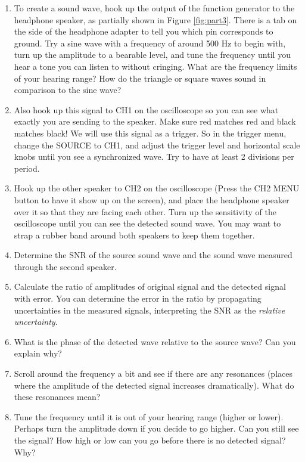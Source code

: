 \begin{enumerate}
\item To create a sound wave, hook up the output of the function generator to the headphone speaker, as partially shown in Figure \ref{fig:part3}. There is a tab on the side of the headphone adapter to tell you which pin corresponds to ground. Try a sine wave with a frequency of around 500 Hz to begin with, turn up the amplitude to a bearable level, and tune the frequency until you hear a tone you can listen to without cringing. What are the frequency limits of your hearing range? How do the triangle or square waves sound in comparison to the sine wave?

\item Also hook up this signal to CH1 on the oscilloscope so you can see what exactly you are sending to the speaker. Make sure red matches red and black matches black! We will use this signal as a trigger. So in the trigger menu, change the SOURCE to CH1, and adjust the trigger level and horizontal scale knobs until you see a synchronized wave. Try to have at least 2 divisions per period.

\item Hook up the other speaker to CH2 on the oscilloscope (Press the CH2 MENU button to have it show up on the screen), and place the headphone speaker over it so that they are facing each other. Turn up the sensitivity of the oscilloscope until you can see the detected sound wave.  You may want to strap a rubber band around both speakers to keep them together.

\item Determine the SNR of the source sound wave and the sound wave measured through the second speaker.

\item Calculate the ratio of amplitudes of original signal and the detected signal with error. You can determine the error in the ratio by propagating uncertainties in the measured signals, interpreting the SNR as the {\it{relative uncertainty}}.

\item What is the phase of the detected wave relative to the source wave? Can you explain why?

\item Scroll around the frequency a bit and see if there are any resonances (places where the amplitude of the detected signal increases dramatically). What do these resonances mean?

\item Tune the frequency until it is out of your hearing range (higher or lower). Perhaps turn the amplitude down if you decide to go higher. Can you still see the signal? How high or low can you go before there is no detected signal? Why?

\end{enumerate}




